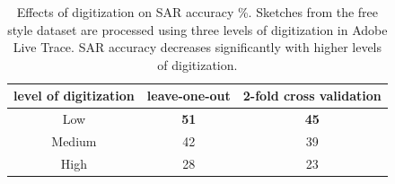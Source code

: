 
\vspace{-1mm}
\begin{table}[!htbp]
\caption {Effects of digitization on SAR accuracy \%. Sketches from the free style dataset are processed using three levels of digitization in Adobe Live Trace. SAR accuracy decreases significantly with higher levels of digitization.}
\label{table:digitization}
\vspace{-2mm}
\centering
\small
\begin{tabular}{c | c | c} 
level of digitization& leave-one-out & 2-fold cross validation \\ \hline

Low       & \textbf{51} &  \textbf{45}\\
Medium       & 42 &  39\\
High      & 28 &  23\\
\end{tabular}\vspace{-2mm}
\end{table}


